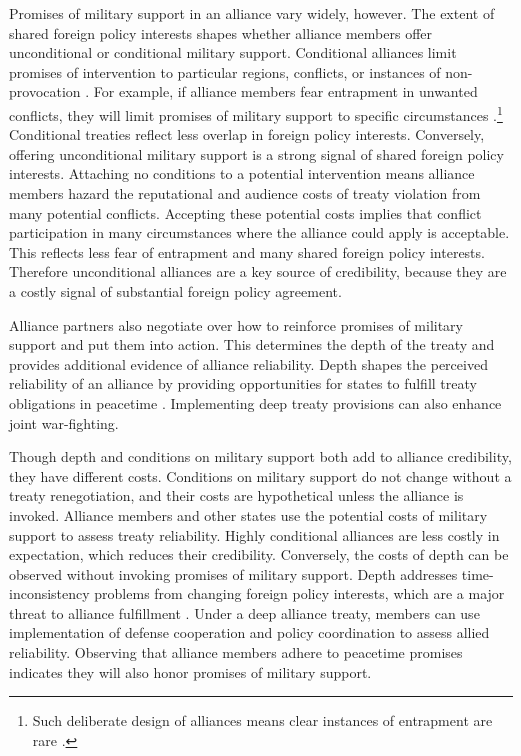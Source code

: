 \documentclass[12pt]{article}
\begin{document}
Promises of military support in an alliance vary widely, however. 
The extent of shared foreign policy interests shapes whether alliance members offer unconditional or conditional military support.
Conditional alliances limit promises of intervention to particular regions, conflicts, or instances of non-provocation \citep{Leedsetal2000}. 
For example, if alliance members fear entrapment in unwanted conflicts, they will limit promises of military support to specific circumstances \citep{Kim2011, Benson2012}.\footnote{Such deliberate design of alliances means clear instances of entrapment are rare \citep{Kim2011, Beckley2015}.} 
Conditional treaties reflect less overlap in foreign policy interests. 
Conversely, offering unconditional military support is a strong signal of shared foreign policy interests. 
Attaching no conditions to a potential intervention means alliance members hazard the reputational \citep{Gibler2008, Crescenzietal2012} and audience \citep{Fearon1997} costs of treaty violation from many potential conflicts. 
Accepting these potential costs implies that conflict participation in many circumstances where the alliance could apply is acceptable.
This reflects less fear of entrapment and many shared foreign policy interests. 
Therefore unconditional alliances are a key source of credibility, because they are a costly signal of substantial foreign policy agreement. 


Alliance partners also negotiate over how to reinforce promises of military support and put them into action. 
This determines the depth of the treaty and provides additional evidence of alliance reliability. 
Depth shapes the perceived reliability of an alliance by providing opportunities for states to fulfill treaty obligations in peacetime \citep{Morrow1994}. 
Implementing deep treaty provisions can also enhance joint war-fighting. 


Though depth and conditions on military support both add to alliance credibility, they have different costs. 
Conditions on military support do not change without a treaty renegotiation, and their costs are hypothetical unless the alliance is invoked.  
Alliance members and other states use the potential costs of military support to assess treaty reliability. 
Highly conditional alliances are less costly in expectation, which reduces their credibility. 
Conversely, the costs of depth can be observed without invoking promises of military support. 
Depth addresses time-inconsistency problems from changing foreign policy interests, which are a major threat to alliance fulfillment \citep{LeedsSavun2007}. 
Under a deep alliance treaty, members can use implementation of defense cooperation and policy coordination to assess allied reliability. 
Observing that alliance members adhere to peacetime promises indicates they will also honor promises of military support. 
\end{document}

